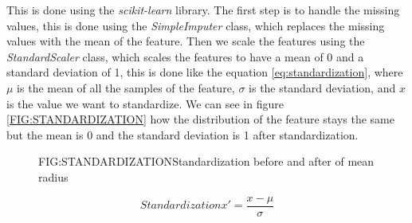This is done using the \textit{scikit-learn} library. The first step is to handle the missing values, this is done using the \textit{SimpleImputer} class, which replaces the missing values with the mean of the feature. Then we scale the features using the \textit{StandardScaler} class, which scales the features to have a mean of 0 and a standard deviation of 1, this is done like the equation \ref{eq:standardization}, where $\mu$ is the mean of all the samples of the feature, $\sigma$ is the standard deviation, and $x$ is the value we want to standardize. We can see in figure \ref{FIG:STANDARDIZATION} how the distribution of the feature stays the same but the mean is 0 and the standard deviation is 1 after standardization.

\begin{figure}[Standardization]{FIG:STANDARDIZATION}{Standardization before and after of mean radius}
\end{figure}

\begin{equation}[eq:standardization]{Standardization}
    \boxed{x' = \frac{x - \mu}{\sigma}}
\end{equation}


